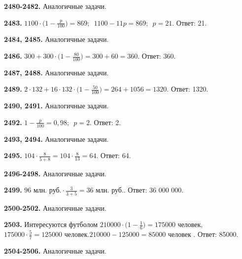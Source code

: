 \textbf{2480-2482.} Аналогичные задачи.

\textbf{2483.} $1100 \cdot \big( 1 - \frac{p}{100}\big) = 869;\enspace 1100 - 11p = 869;\enspace p = 21.$ \newline \null \hspace*{\fill} Ответ: 21. 

\textbf{2484, 2485.} Аналогичные задачи.

\textbf{2486.} $300 + 300 \cdot \big(1 - \frac{80}{100}\big) = 300 + 60 = 360.$ \newline \null \hspace*{\fill} Ответ: 360. 

\textbf{2487, 2488.} Аналогичные задачи.

\textbf{2489.} $2 \cdot 132 + 16 \cdot 132 \cdot \big( 1 -\frac{50}{100}\big) = 264 + 1056 = 1320.$ \newline \null \hspace*{\fill} Ответ: 1320. 

\textbf{2490, 2491.} Аналогичные задачи.

\textbf{2492.} $1 - \frac{p}{100} = 0,98;\enspace p = 2.$ \null \hspace*{\fill} Ответ: 2. 

\textbf{2493, 2494.} Аналогичные задачи.

\textbf{2495.} $104 \cdot \frac{8}{5+8} = 104 \cdot \frac{8}{13} = 64.$ \newline \null \hspace*{\fill} Ответ: 64. 

\textbf{2496-2498.} Аналогичные задачи.

\textbf{2499.} $\text{96 млн. руб.}\cdot \frac{3}{3+5} = \text{36 млн. руб.}.$ \newline \null \hspace*{\fill} Ответ: 36 000 000. 

\textbf{2500-2502.} Аналогичные задачи.

\textbf{2503.} $\text{Интересуются футболом } 210000 \cdot \big( 1 - \frac{1}{6}\big) = 175000 \text{ человек,}$\newline{}$ 175 000 \cdot \frac{5}{7} = 125 000 \text{ человек.}$\newline{}$ 210000 - 125000 = 85000 \text{ человек }.$ \newline \null \hspace*{\fill} Ответ: 85000. 

\textbf{2504-2506.} Аналогичные задачи.

